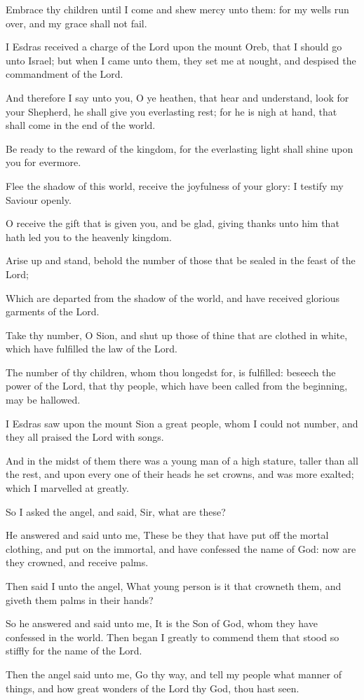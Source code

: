 {\par }{\PP {}Embrace thy children until I come and shew mercy unto them: for my wells run over, and my grace shall not fail.
\par }{\PP {}I Esdras received a charge of the Lord upon the mount Oreb, that I should go unto Israel; but when I came unto them, they set me at nought, and despised the commandment of the Lord.
\par }{\PP {}And therefore I say unto you, O ye heathen, that hear and understand, look for your Shepherd, he shall give you everlasting rest; for he is nigh at hand, that shall come in the end of the world.
\par }{\PP {}Be ready to the reward of the kingdom, for the everlasting light shall shine upon you for evermore.
\par }{\PP {}Flee the shadow of this world, receive the joyfulness of your glory: I testify my Saviour openly.
\par }{\PP {}O receive the gift that is given you, and be glad, giving thanks unto him that hath led you to the heavenly kingdom.
\par }{\PP {}Arise up and stand, behold the number of those that be sealed in the feast of the Lord;
\par }{\PP {}Which are departed from the shadow of the world, and have received glorious garments of the Lord.
\par }{\PP {}Take thy number, O Sion, and shut up those of thine that are clothed in white, which have fulfilled the law of the Lord.
\par }{\PP {}The number of thy children, whom thou longedst for, is fulfilled: beseech the power of the Lord, that thy people, which have been called from the beginning, may be hallowed.
\par }{\PP {}I Esdras saw upon the mount Sion a great people, whom I could not number, and they all praised the Lord with songs.
\par }{\PP {}And in the midst of them there was a young man of a high stature, taller than all the rest, and upon every one of their heads he set crowns, and was more exalted; which I marvelled at greatly.
\par }{\PP {}So I asked the angel, and said, Sir, what are these?
\par }{\PP {}He answered and said unto me, These be they that have put off the mortal clothing, and put on the immortal, and have confessed the name of God: now are they crowned, and receive palms.
\par }{\PP {}Then said I unto the angel, What young person is it that crowneth them, and giveth them palms in their hands?
\par }{\PP {}So he answered and said unto me, It is the Son of God, whom they have confessed in the world. Then began I greatly to commend them that stood so stiffly for the name of the Lord.
\par }{\PP {}Then the angel said unto me, Go thy way, and tell my people what manner of things, and how great wonders of the Lord thy God, thou hast seen.

}
